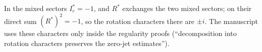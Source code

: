 \begin{remark}
In the mixed sectors $I_c^*=-1$, and $R^*$ exchanges the two mixed sectors;
on their direct sum $(R^*)^2=-1$, so the rotation characters there are $\pm i$.
The manuscript uses these characters only inside the regularity proofs
(``decomposition into rotation characters preserves the zero-jet
estimates'').
\end{remark}
